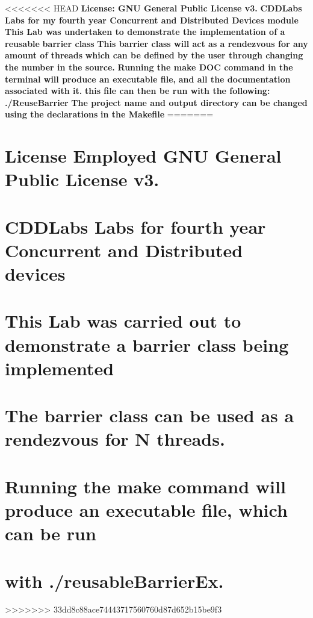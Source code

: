 <<<<<<< HEAD
{\bfseries License\+: G\+NU General Public License v3.} {\bfseries C\+D\+D\+Labs Labs for my fourth year Concurrent and Distributed Devices module} {\bfseries This Lab was undertaken to demonstrate the implementation of a reusable} {\bfseries barrier class} {\bfseries This barrier class will act as a rendezvous for any amount of threads} {\bfseries which can be defined by the user through changing the number in the source.} {\bfseries Running the \textquotesingle{}make D\+OC\textquotesingle{} command in the terminal will produce an executable file,} {\bfseries and all the documentation associated with it.} {\bfseries this file can then be run with the following\+: ./\+Reuse\+Barrier} {\bfseries The project name and output directory can be changed using the declarations} {\bfseries in the Makefile} 
=======
\section*{License Employed G\+NU General Public License v3.}

\section*{C\+D\+D\+Labs Labs for fourth year Concurrent and Distributed devices}

\section*{This Lab was carried out to demonstrate a barrier class being implemented}

\section*{The barrier class can be used as a rendezvous for N threads.}

\section*{Running the make command will produce an executable file, which can be run}

\section*{with ./reusable\+Barrier\+Ex.}
>>>>>>> 33dd8c88ace74443717560760d87d652b15be9f3
